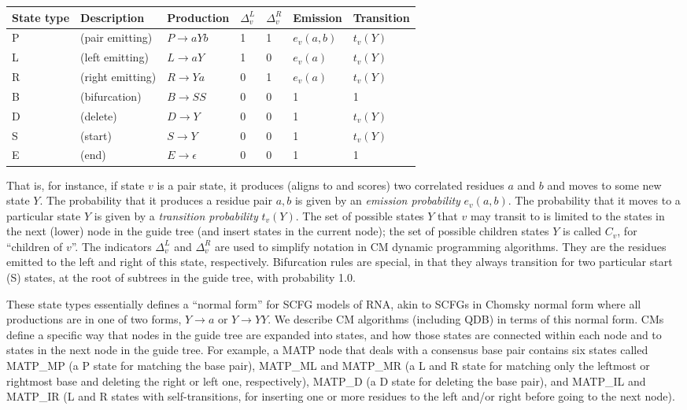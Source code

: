 \documentclass[11pt]{article}
\begin{document}
\vspace{0.5em}
\begin{tabular}{lllllll}
State type & Description &  Production   & $\Delta_v^{L}$ & $\Delta_v^{R}$ & Emission & Transition\\ \hline
P & (pair emitting)   & $P \rightarrow a Y b$ & 1 & 1 & $e_v(a,b)$ & $t_v(Y)$  \\
L & (left emitting)   & $L \rightarrow a Y$   & 1 & 0 & $e_v(a)$   & $t_v(Y)$  \\
R & (right emitting)  & $R \rightarrow Y a$   & 0 & 1 & $e_v(a)$   & $t_v(Y)$  \\
B & (bifurcation)     & $B \rightarrow S S$   & 0 & 0 & 1     &     1     \\
D & (delete)          & $D \rightarrow Y$     & 0 & 0 & 1     &   $t_v(Y)$  \\
S & (start)           & $S \rightarrow Y$     & 0 & 0 &    1     & $t_v(Y)$  \\
E & (end)             & $E \rightarrow \epsilon$ & 0 & 0 & 1     &     1     \\
\end{tabular}
\vspace{0.5em}

That is, for instance, if state $v$ is a pair state, it produces
(aligns to and scores) two correlated residues $a$ and $b$ and moves
to some new state $Y$.  The probability that it produces a residue
pair $a,b$ is given by an \emph{emission probability} $e_v(a,b)$.  The
probability that it moves to a particular state $Y$ is given by a
\emph{transition probability} $t_v(Y)$.  The set of possible states
$Y$ that $v$ may transit to is limited to the states in the next
(lower) node in the guide tree (and insert states in the current
node); the set of possible children states $Y$ is called $C_v$, for
``children of $v$''. The indicators $\Delta_v^{L}$ and $\Delta_v^{R}$
are used to simplify notation in CM dynamic programming algorithms.
They are the residues emitted to the left and right of this state,
respectively. Bifurcation rules are special, in that they always
transition for two particular start (S) states, at the root of
subtrees in the guide tree, with probability 1.0.

These state types essentially defines a ``normal form'' for SCFG
models of RNA, akin to SCFGs in Chomsky normal form where all
productions are in one of two forms, $Y \rightarrow a$ or $Y
\rightarrow YY$. We describe CM algorithms (including QDB) in terms of
this normal form. CMs define a specific way that nodes in the guide
tree are expanded into states, and how those states are connected
within each node and to states in the next node in the guide tree. For
example, a MATP node that deals with a consensus base pair contains
six states called MATP\_MP (a P state for matching the base pair),
MATP\_ML and MATP\_MR (a L and R state for matching only the leftmost
or rightmost base and deleting the right or left one, respectively),
MATP\_D (a D state for deleting the base pair), and MATP\_IL and
MATP\_IR (L and R states with self-transitions, for inserting one or
more residues to the left and/or right before going to the next
node).
\end{document}
